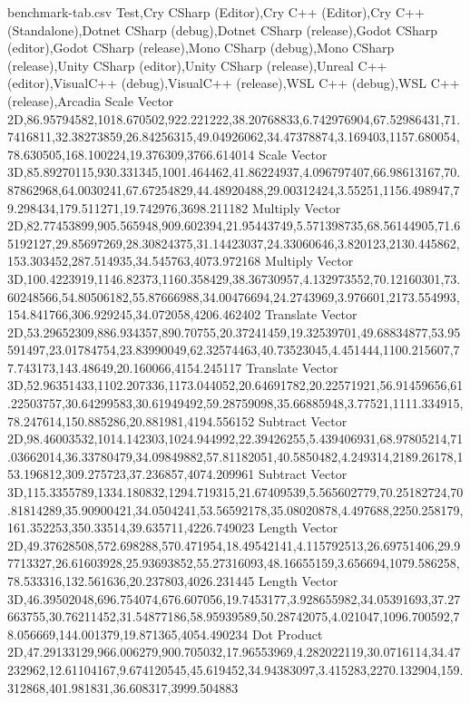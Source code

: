 \begin{filecontents*}{benchmark-tab.csv}
Test,Cry CSharp (Editor),Cry C++ (Editor),Cry C++ (Standalone),Dotnet CSharp (debug),Dotnet CSharp (release),Godot CSharp (editor),Godot CSharp (release),Mono CSharp (debug),Mono CSharp (release),Unity CSharp (editor),Unity CSharp (release),Unreal C++ (editor),VisualC++ (debug),VisualC++ (release),WSL C++ (debug),WSL C++ (release),Arcadia
Scale Vector 2D,86.95794582,1018.670502,922.221222,38.20768833,6.742976904,67.52986431,71.7416811,32.38273859,26.84256315,49.04926062,34.47378874,3.169403,1157.680054,78.630505,168.100224,19.376309,3766.614014
Scale Vector 3D,85.89270115,930.331345,1001.464462,41.86224937,4.096797407,66.98613167,70.87862968,64.0030241,67.67254829,44.48920488,29.00312424,3.55251,1156.498947,79.298434,179.511271,19.742976,3698.211182
Multiply Vector 2D,82.77453899,905.565948,909.602394,21.95443749,5.571398735,68.56144905,71.65192127,29.85697269,28.30824375,31.14423037,24.33060646,3.820123,2130.445862,153.303452,287.514935,34.545763,4073.972168
Multiply Vector 3D,100.4223919,1146.82373,1160.358429,38.36730957,4.132973552,70.12160301,73.60248566,54.80506182,55.87666988,34.00476694,24.2743969,3.976601,2173.554993,154.841766,306.929245,34.072058,4206.462402
Translate Vector 2D,53.29652309,886.934357,890.70755,20.37241459,19.32539701,49.68834877,53.95591497,23.01784754,23.83990049,62.32574463,40.73523045,4.451444,1100.215607,77.743173,143.48649,20.160066,4154.245117
Translate Vector 3D,52.96351433,1102.207336,1173.044052,20.64691782,20.22571921,56.91459656,61.22503757,30.64299583,30.61949492,59.28759098,35.66885948,3.77521,1111.334915,78.247614,150.885286,20.881981,4194.556152
Subtract Vector 2D,98.46003532,1014.142303,1024.944992,22.39426255,5.439406931,68.97805214,71.03662014,36.33780479,34.09849882,57.81182051,40.5850482,4.249314,2189.26178,153.196812,309.275723,37.236857,4074.209961
Subtract Vector 3D,115.3355789,1334.180832,1294.719315,21.67409539,5.565602779,70.25182724,70.81814289,35.90900421,34.0504241,53.56592178,35.08020878,4.497688,2250.258179,161.352253,350.33514,39.635711,4226.749023
Length Vector 2D,49.37628508,572.698288,570.471954,18.49542141,4.115792513,26.69751406,29.97713327,26.61603928,25.93693852,55.27316093,48.16655159,3.656694,1079.586258,78.533316,132.561636,20.237803,4026.231445
Length Vector 3D,46.39502048,696.754074,676.607056,19.7453177,3.928655982,34.05391693,37.27663755,30.76211452,31.54877186,58.95939589,50.28742075,4.021047,1096.700592,78.056669,144.001379,19.871365,4054.490234
Dot Product 2D,47.29133129,966.006279,900.705032,17.96553969,4.282022119,30.0716114,34.47232962,12.61104167,9.674120545,45.619452,34.94383097,3.415283,2270.132904,159.312868,401.981831,36.608317,3999.504883

\end{filecontents*}
